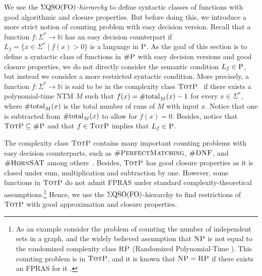 
We use the \emph{$\Sigma{\rm QSO}({\rm FO})$-hierarchy} to define syntactic classes of functions with good algorithmic and closure properties.  
But before doing this, we introduce a more strict notion of counting problem with easy decision version.
Recall that a function $f\colon\Sigma^* \to \mathbb{N}$ has an easy decision counterpart if $L_f = \{ x \in \Sigma^* \mid f(x) > 0 \}$ is a language in $\text{\sc P}$. As the goal of this section is to define a syntactic class of functions in $\text{\sc \#P}$ with easy decision versions and good closure properties, we do not directly consider the semantic condition $L_f  \in \text{\sc P}$, but instead we consider a more restricted syntactic condition. More precisely, a function $f\colon\Sigma^* \to \mathbb{N}$ is said to be in the complexity class $\text{\sc TotP}$~\cite{PagourtzisZ06} if there exists a  polynomial-time NTM $M$ such that $f(x) = \text{\rm \#total}_M(x) - 1$ for every $x \in \Sigma^*$, where $\text{\rm \#total}_M(x)$ is the total number of runs of $M$ with input $x$. Notice that one is subtracted from $\text{\rm \#total}_M(x)$ to allow for $f(x) = 0$. Besides, notice that $\text{\sc TotP} \subseteq \text{\sc \#P}$ and that $f \in \text{\sc TotP}$ implies that $L_f \in \text{\sc P}$. 

The complexity class $\text{\sc TotP}$ contains many important counting problems with easy decision counterparts, such as $\textsc{\#PerfectMatching}$, $\textsc{\#DNF}$, and $\textsc{\#HornSAT}$ among others~\cite{PagourtzisZ06}. Besides, $\text{\sc TotP}$ has good closure properties as it is closed under sum, multiplication and subtraction by one. However, some functions in $\text{\sc TotP}$ do not admit FPRAS under standard complexity-theoretical assumptions.\footnote{As an example consider the problem of counting the number of independent sets in a graph, and the widely believed assumption that $\text{\sc NP}$ is not equal to the randomized complexity class $\text{\sc RP}$ (Randomized Polynomial-Time \cite{G77}). This counting problem is in $\text{\sc TotP}$, and it is known that $\text{\sc NP} = \text{\sc RP}$ if there exists an FPRAS for it \cite{DFJ02}.}
Hence, we use the $\Sigma{\rm QSO}({\rm FO})$-hierarchy to find restrictions of $\text{\sc TotP}$ with good approximation and closure properties.

